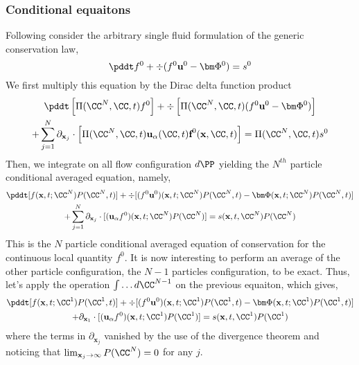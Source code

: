 \subsubsection*{Conditional equaitons}

Following \citet{hinch1977averaged} consider the arbitrary single fluid formulation of the generic conservation law, 
\begin{equation*}
    \pddt f^0
    + \div 
    (f^0\textbf{u}^0
    - \bm\Phi^0)
    = s^0
\end{equation*}
We first multiply this equation by the Dirac delta function product 
\begin{multline*}
    \pddt \left[\Pi(\CC^N,\CC,t)f^0\right]
    + \div \left[\Pi(\CC^N,\CC,t)
    (f^0\textbf{u}^0
    - \bm\Phi^0)
    \right] \\
    +\sum_{j=1}^N \partial_{\textbf{x}_j}\cdot\left[
        \Pi(\CC^N,\CC,t) 
        \textbf{u}_\alpha(\CC,t)
        \textbf{f}^0(\textbf{x},\CC,t)
    \right]
    = \Pi(\CC^N,\CC,t) s^0
\end{multline*}
Then, we integrate on all flow configuration $d\PP$ yielding the $N^{th}$ particle conditional averaged equation, namely,
\begin{multline*}
    \pddt [f(\textbf{x},t;\CC^N)P(\CC^N,t)]
    + \div [
    (f^0\textbf{u}^0)(\textbf{x},t;\CC^N)P(\CC^N,t)
    - \bm\Phi(\textbf{x},t;\CC^N)P(\CC^N,t)
    ] \\
    +\sum_{j=1}^N \partial_{\textbf{x}_j}\cdot[
        (\textbf{u}_\alpha f^0)(\textbf{x},t;\CC^N)P(\CC^N)
    ]
    = s(\textbf{x},t,\CC^N) P(\CC^N)
\end{multline*}
This is the $N$ particle conditional averaged equation of conservation for the continuous local quantity $f^0$. 
It is now interesting to perform an average of the other particle configuration, the $N-1$ particles configuration, to be exact. 
Thus, let's apply the operation $\int \ldots d\CC^{N-1}$ on the previous equaiton, which gives,
\begin{multline*}
    \pddt [f(\textbf{x},t;\CC^1)P(\CC^1,t)]
    + \div [
    (f^0\textbf{u}^0)(\textbf{x},t;\CC^1)P(\CC^1,t)
    - \bm\Phi(\textbf{x},t;\CC^1)P(\CC^1,t)
    ] \\
    + \partial_{\textbf{x}_1}\cdot[
        (\textbf{u}_\alpha f^0)(\textbf{x},t;\CC^1)P(\CC^1)
    ]
    = s(\textbf{x},t,\CC^1) P(\CC^1)
\end{multline*} 
where the terms in $\partial_{\textbf{x}_j}$ vanished by the use of the divergence theorem and noticing that $\lim_{\textbf{x}_j\to\infty} P(\CC^N) =0$ for any $j$. 

